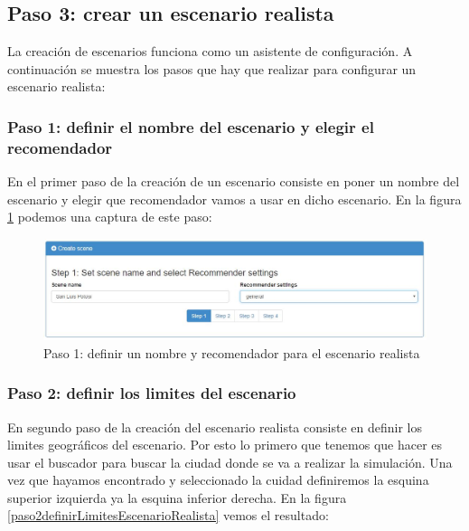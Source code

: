 \subsection{Paso 3: crear un escenario realista}

La creación de escenarios funciona como un asistente de configuración. A continuación se muestra los pasos que hay que realizar para configurar un escenario realista:

\subsubsection{Paso 1: definir el nombre del escenario y elegir el recomendador}

En el primer paso de la creación de un escenario consiste en poner un nombre del escenario y elegir que recomendador vamos a usar en dicho escenario. En la figura \ref{paso1DefinirNombreYrecomendador} podemos una captura de este paso:

\begin{figure}[H]
	\centering\includegraphics[scale=0.45]{imagenes/explotacion/1.jpg}
	\caption{Paso 1: definir un nombre y recomendador para el escenario realista}
	\label{paso1DefinirNombreYrecomendador}
\end{figure}

\subsubsection{Paso 2: definir los limites del escenario}

En segundo paso de la creación del escenario realista consiste en definir los limites geográficos del escenario. Por esto lo primero que tenemos que hacer es usar el buscador para buscar la ciudad donde se va a realizar la simulación. Una vez que hayamos encontrado y seleccionado la cuidad definiremos la esquina superior izquierda ya la esquina inferior derecha. En la figura \ref{paso2definirLimitesEscenarioRealista} vemos el resultado:

